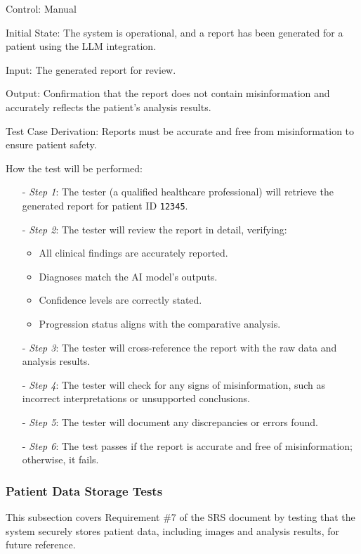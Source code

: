 \documentclass[12pt, titlepage]{article}
\begin{document}
\begin{enumerate}
  Control: Manual
  
  Initial State: The system is operational, and a report has been generated for a patient using the LLM integration.
  
  Input: The generated report for review.
  
  Output: Confirmation that the report does not contain misinformation and accurately reflects the patient's analysis results.
  
  Test Case Derivation: Reports must be accurate and free from misinformation to ensure patient safety.
  
  How the test will be performed:
  
  \begin{itemize}
  \item[-] \textit{Step 1}: The tester (a qualified healthcare professional) will retrieve the generated report for patient ID \texttt{12345}.
  \item[-] \textit{Step 2}: The tester will review the report in detail, verifying:
    \begin{itemize}
      \item All clinical findings are accurately reported.
      \item Diagnoses match the AI model's outputs.
      \item Confidence levels are correctly stated.
      \item Progression status aligns with the comparative analysis.
    \end{itemize}
  \item[-] \textit{Step 3}: The tester will cross-reference the report with the raw data and analysis results.
  \item[-] \textit{Step 4}: The tester will check for any signs of misinformation, such as incorrect interpretations or unsupported conclusions.
  \item[-] \textit{Step 5}: The tester will document any discrepancies or errors found.
  \item[-] \textit{Step 6}: The test passes if the report is accurate and free of misinformation; otherwise, it fails.
  \end{itemize}
\end{enumerate}

\subsubsection{Patient Data Storage Tests}

This subsection covers Requirement \#7 of the SRS document by testing that the system securely stores patient data, including images and analysis results, for future reference.
\end{document}
